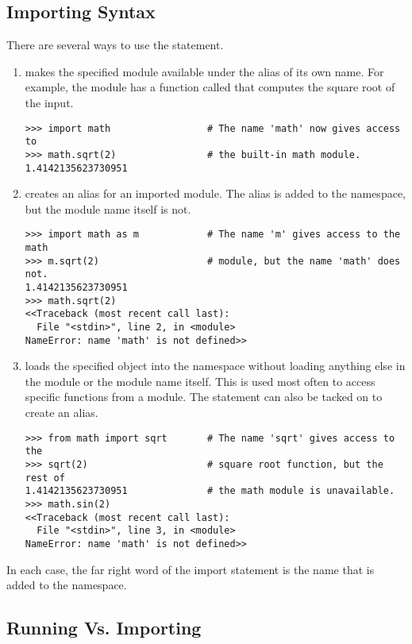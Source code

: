 \subsection*{Importing Syntax}
There are several ways to use the  statement.
\begin{enumerate}

\item {} makes the specified module available under the alias of its own name. For example, the  module has a function called  that computes the square root of the input.
\begin{lstlisting}
>>> import math                 # The name 'math' now gives access to
>>> math.sqrt(2)                # the built-in math module.
1.4142135623730951
\end{lstlisting}

\item {} creates an alias for an imported module. The alias is added to the namespace, but the module name itself is not.
\begin{lstlisting}
>>> import math as m            # The name 'm' gives access to the math
>>> m.sqrt(2)                   # module, but the name 'math' does not.
1.4142135623730951
>>> math.sqrt(2)
<<Traceback (most recent call last):
  File "<stdin>", line 2, in <module>
NameError: name 'math' is not defined>>
\end{lstlisting}

\item {} loads the specified object into the namespace without loading anything else in the module or the module name itself.
This is used most often to access specific functions from a module.
The  statement can also be tacked on to create an alias.
\begin{lstlisting}
>>> from math import sqrt       # The name 'sqrt' gives access to the
>>> sqrt(2)                     # square root function, but the rest of
1.4142135623730951              # the math module is unavailable.
>>> math.sin(2)
<<Traceback (most recent call last):
  File "<stdin>", line 3, in <module>
NameError: name 'math' is not defined>>
\end{lstlisting}
\end{enumerate}
In each case, the far right word of the import statement is the name that is added to the namespace.

\subsection*{Running Vs. Importing}

